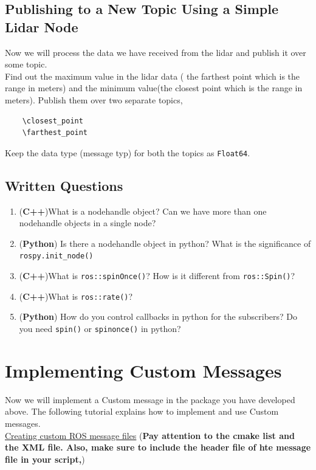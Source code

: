 \documentclass[letta4 paper]{article}
\numberwithin{equation}{section}
\newcommand{\0}{\mathbf{0}}
\begin{document}
	\subsection{Publishing to a New Topic Using a Simple Lidar Node}
	
	Now we will process the data we have received from the lidar and publish it over some topic. 
	\\
	Find out the maximum value in the lidar data ( the farthest point which is the range in meters) and the minimum value(the closest point which is the range in meters). Publish them over two separate topics,
	\begin{lstlisting}
	\closest_point
	\farthest_point
	\end{lstlisting}{}
	Keep the data type (message typ) for both the topics as \texttt{Float64}. 
	
	\subsection{Written Questions}
	\begin{enumerate}
		\item (\textbf{C++})What is a nodehandle object? Can we have more than one nodehandle objects in a single node? 
		\item (\textbf{Python}) Is there a nodehandle object in python? What is the significance of \texttt{rospy.init\_node()}
		\item (\textbf{C++})What is \texttt{ros::spinOnce()}? How is it different from \texttt{ros::Spin()}?
		\item (\textbf{C++})What is \texttt{ros::rate()}? 
		\item (\textbf{Python}) How do you control callbacks in python for the subscribers? Do you need \texttt{spin()} or \texttt{spinonce()} in python?
	\end{enumerate}{}
			
	\section{ Implementing Custom Messages}
	Now we will implement a Custom message in the package you have developed above. The following tutorial explains how to implement and use Custom messages. \\
	\href{http://wiki.ros.org/ROS/Tutorials/CreatingMsgAndSrv}{ Creating custom ROS message files}
	(\textbf{Pay attention to the cmake list and the XML file. Also, make sure to include the header file of hte message file in your script,})\\
	
\end{document}
